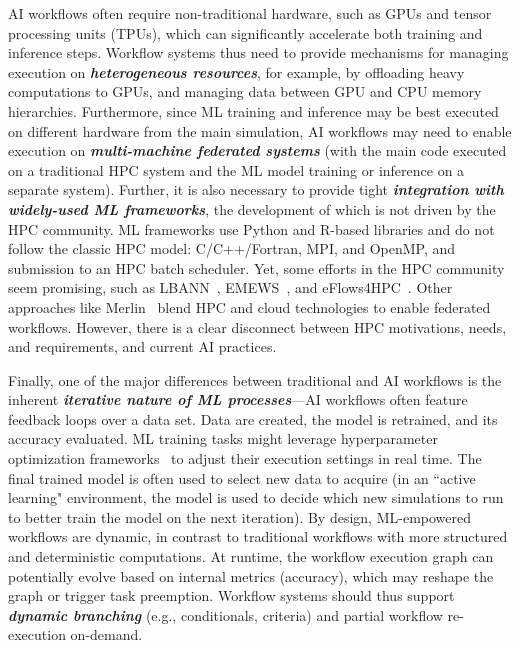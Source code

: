 AI workflows often require non-traditional hardware, such as GPUs and tensor processing units (TPUs), which can significantly accelerate both training and inference steps. Workflow systems thus need to provide mechanisms for managing execution on \textbf{\emph{heterogeneous resources}}, for example, by offloading heavy computations to GPUs, and managing data between GPU and CPU memory hierarchies. Furthermore, since ML training and inference may be best executed on different hardware from the main simulation, AI workflows may need to enable execution on \textbf{\textit{multi-machine federated systems}} (with the main code executed on a traditional HPC system and the ML model training or inference on a separate system). Further, it is also necessary to provide tight \textbf{\emph{integration with widely-used ML frameworks}}, the development of which is not driven by the HPC community. ML frameworks use Python and R-based libraries and do not follow the classic HPC model: C/C++/Fortran, MPI, and OpenMP, and submission to an HPC batch scheduler. Yet, some efforts in the HPC community seem promising, such as LBANN~\cite{lbann}, EMEWS~\cite{ozik_population_2021}, and eFlows4HPC~\cite{eflows}. Other approaches like Merlin~\cite{merlin} blend HPC and cloud technologies to enable federated workflows.  However, there is a clear disconnect between HPC motivations, needs, and requirements, and current AI practices.

Finally, one of the major differences between traditional and AI workflows is the inherent \textbf{\emph{iterative nature of ML processes}}---AI workflows often feature feedback loops over a data set. Data are created, the model is retrained, and its accuracy evaluated. ML training tasks might leverage hyperparameter optimization frameworks~\cite{akiba2019optuna, bergstra2013hyperopt, wozniak2018} to adjust their execution settings in real time. The final trained model is often used to select new data to acquire (in an ``active learning" environment, the model is used to decide which new simulations to run to better train the model on the next iteration). By design, ML-empowered workflows are dynamic, in contrast to traditional workflows with more structured and deterministic computations. At runtime, the workflow execution graph can potentially evolve based on internal metrics (accuracy), which may reshape the graph or trigger task preemption. Workflow systems should thus support \textbf{\emph{dynamic branching}} (e.g., conditionals, criteria) and partial workflow re-execution on-demand.



